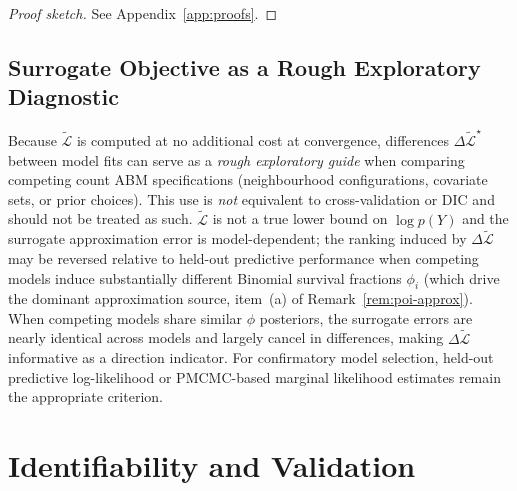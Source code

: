 \documentclass[review,12pt]{elsarticle}
\theoremstyle{definition}
\begin{document}
\begin{proof}[Proof sketch]
See Appendix~\ref{app:proofs}.
\end{proof}

\subsection{Surrogate Objective as a Rough Exploratory Diagnostic}
\label{sec:elbo-sel}

Because $\tilde{\mathcal{L}}$ is computed at no additional cost at convergence,
differences $\Delta\tilde{\mathcal{L}}^\star$ between model fits can serve as a
\emph{rough exploratory guide} when comparing competing count ABM specifications
(neighbourhood configurations, covariate sets, or prior choices).
This use is \emph{not} equivalent to cross-validation or DIC and should not
be treated as such.  $\tilde{\mathcal{L}}$ is not a true lower bound on
$\log p(Y)$ and the surrogate approximation error is model-dependent; the ranking
induced by $\Delta\tilde{\mathcal{L}}$ may be reversed relative to held-out
predictive performance when competing models induce substantially different
Binomial survival fractions $\phi_i$ (which drive the dominant approximation
source, item~(a) of Remark~\ref{rem:poi-approx}).  When competing models share
similar $\phi$ posteriors, the surrogate errors are nearly identical across models
and largely cancel in differences, making $\Delta\tilde{\mathcal{L}}$ informative as
a direction indicator.  For confirmatory model selection, held-out predictive
log-likelihood or PMCMC-based marginal likelihood estimates remain the
appropriate criterion.

\section{Identifiability and Validation}\label{sec:identif-val}
\end{document}
